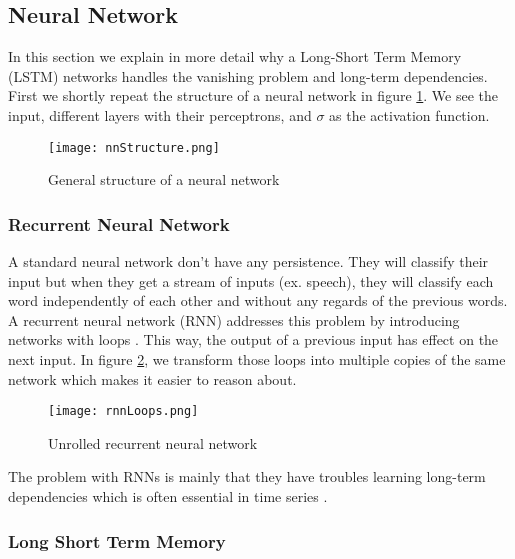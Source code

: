 \subsection{Neural Network}
\label{sec:nn}

In this section we explain in more detail why a Long-Short Term Memory (LSTM) \cite{lstmOrginin:article} networks handles the vanishing problem and long-term dependencies. \\

First we shortly repeat the structure of a neural network in figure \ref{fig:nnStructure}. We see the input, different layers with their perceptrons, and $\sigma$ as the activation function. 

\begin{figure}[H]
	\centering
	\texttt{[image: nnStructure.png]}
	\caption{General structure of a neural network \cite{IMECJaak}}
	\label{fig:nnStructure}
\end{figure} 

\subsubsection{Recurrent Neural Network}
\label{sec:rnn}

A standard neural network don't have any persistence. They will classify their input but when they get a stream of inputs (ex. speech), they will classify each word independently of each other and without any regards of the previous words. A recurrent neural network (RNN) addresses this problem by introducing networks with loops \cite{rnnOrigin:article}. This way, the output of a previous input has effect on the next input. In figure \ref{fig:rnnLoops}, we transform those loops into multiple copies of the same network which makes it easier to reason about.

\begin{figure}[H]
	\centering
	\texttt{[image: rnnLoops.png]}
	\caption{Unrolled recurrent neural network \cite{IMECJaak}}
	\label{fig:rnnLoops}
\end{figure} 

The problem with RNNs is mainly that they have troubles learning long-term dependencies which is often essential in time series \cite{longDepRNN:article}.


\subsubsection{Long Short Term Memory}
\label{sec:lstm}

